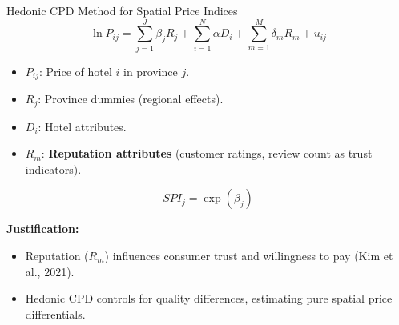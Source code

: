 \documentclass{beamer}
\begin{document}
\begin{frame}{Hedonic CPD Method for Spatial Price Indices}
\begin{equation}
\ln P_{ij} = \sum_{j=1}^J \beta_j R_j + \sum_{i = 1}^N \alpha D_i +  \sum_{m=1}^{M} \delta_m R_m + u_{ij}
\end{equation}


\begin{itemize}
    \item $P_{ij}$: Price of hotel $i$ in province $j$.
    \item $R_j$: Province dummies (regional effects).
    \item $D_i$: Hotel attributes.
    \item $R_m$: \textbf{Reputation attributes} (customer ratings, review count as trust indicators).
\end{itemize}

\begin{equation}
SPI_j = \exp(\beta_j)
\end{equation}

\textbf{Justification:}
\begin{itemize}
    \item Reputation ($R_m$) influences consumer trust and willingness to pay (Kim et al., 2021).
    \item Hedonic CPD controls for quality differences, estimating pure spatial price differentials.
\end{itemize}

\end{frame}
\end{document}
